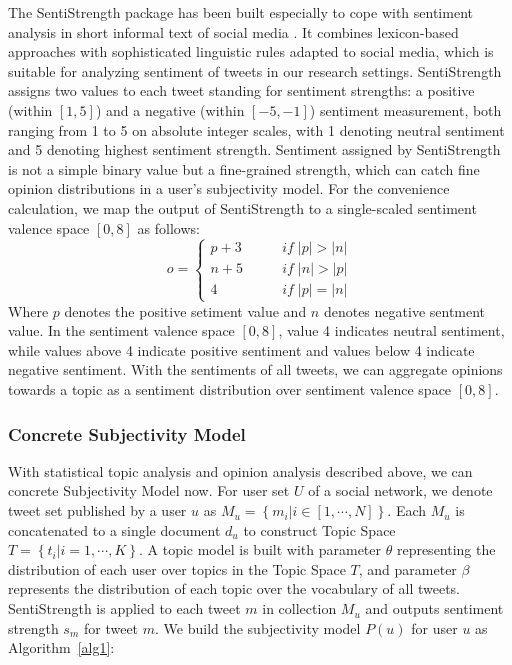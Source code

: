 \documentclass[runningheads,a4paper]{llncs}
\begin{document}
The SentiStrength package has been built especially to cope with sentiment analysis in short informal text of social media \cite{thelwall2010sentiment}. 
It combines lexicon-based approaches with sophisticated linguistic rules adapted to social media, which is suitable for analyzing sentiment of tweets in our research settings. 
SentiStrength assigns two values to each tweet standing for sentiment strengths: a positive (within $ [1,5] $) and a negative (within $ [-5,-1] $) sentiment measurement, both ranging from 1 to 5 on absolute integer scales, with 1 denoting neutral sentiment and 5 denoting highest sentiment strength. 
Sentiment assigned by SentiStrength is not a simple binary value but a fine-grained strength, which can catch fine opinion distributions in a user's subjectivity model. 
For the convenience calculation, we map the output of SentiStrength to a single-scaled sentiment valence space $ [0, 8] $ as follows: 
\begin{equation}
\label{opinionmap}
o= \left\{ 
\begin{array}{lll}
{p+3} &  \qquad if \; \vert p \vert > \vert n \vert \\
{n+5} &  \qquad if \; \vert n \vert > \vert p \vert \\
{4}  &   \qquad if \; \vert p \vert = \vert n \vert
\end{array}
\right.
\end{equation}
Where $ p $ denotes the positive setiment value and $ n $ denotes negative sentment value.
In the sentiment valence space $ [0, 8] $, value 4 indicates neutral sentiment, while values above 4 indicate positive sentiment and values below 4 indicate negative sentiment. With the sentiments of all tweets, we can aggregate opinions towards a topic as a sentiment distribution over sentiment valence space $ [0, 8] $.

\subsubsection{Concrete Subjectivity Model}
\label{concrete}

With statistical topic analysis and opinion analysis described above, we can concrete Subjectivity Model now. 
For user set $ U $ of a social network, we denote tweet set published by a user $ u $ as $ M_{u}=\left\lbrace m_{i} \vert i \in \left[ 1, \cdots, N \right]  \right\rbrace$. Each $ M_{u} $ is concatenated to a single document $ d_{u} $ to construct Topic Space $ T=\left\lbrace t_{i} \vert i=1, \cdots, K \right\rbrace $.
A topic model is built with parameter $ \theta $ representing the distribution of each user over topics in the Topic Space $ T $, and
parameter $ \beta $ represents the distribution of each topic over the vocabulary of all tweets. SentiStrength is applied to each tweet $ m $ in collection $ M_{u} $ and outputs sentiment strength $ s_{m} $ for tweet $ m $. 
We build the subjectivity model $ P(u) $ for user $ u $ as Algorithm~\ref{alg1}:
\end{document}
